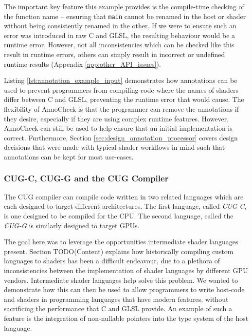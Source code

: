 \documentclass[a4paper,12pt,twoside,openright]{report}
\begin{document}

The important key feature this example provides is the compile-time checking of
the function name -- ensuring that \texttt{main} cannot be renamed in the host
or shader without being consistently renamed in the other. If we were to ensure
such an error was introduced in raw C and GLSL, the resulting behaviour would
be a runtime error. However, not all inconsistencies which can be checked like
this result in runtime errors, others can simply result in incorrect or
undefined runtime results (Appendix \ref{app:other_API_issues}).

Listing \ref{lst:annotation_example_input} demonstrates how annotations can be
used to prevent programmers from compiling code where the names of shaders
differ between C and GLSL, preventing the runtime error that would cause. The
flexibility of AnnoCheck is that the programmer can remove the annotations if
they desire, especially if they are using complex runtime features. However,
AnnoCheck can still be used to help ensure that an initial implementation is
correct. Furthermore, Section \ref{sec:design_annotation_processor} covers
design decisions that were made with typical shader workflows in mind such that
annotations can be kept for most use-cases.

\subsubsection{CUG-C, CUG-G and the CUG Compiler}

The CUG compiler can compile code written in two related languages which are each
designed to target different architectures. The first language, called
\textit{CUG-C}, is one designed to be compiled for the CPU. The second
language, called the \textit{CUG-G} is similarly designed to target GPUs.


The goal here was to leverage the opportunities intermediate shader languages
present. Section TODO(Content) explains how historically compiling custom
languages to shaders has been a difficult endeavour, due to a plethora of
inconsistencies between the implementation of shader languages by different GPU
vendors. Intermediate shader languages help solve this problem. We wanted to
demonstrate how this can then be used to allow programmers to write host-code
and shaders in programming languages that have modern features, without
sacrificing the performance that C and GLSL provide. An example of such a
feature is the integration of non-nullable pointers into the type system of the
host language.
\end{document}
